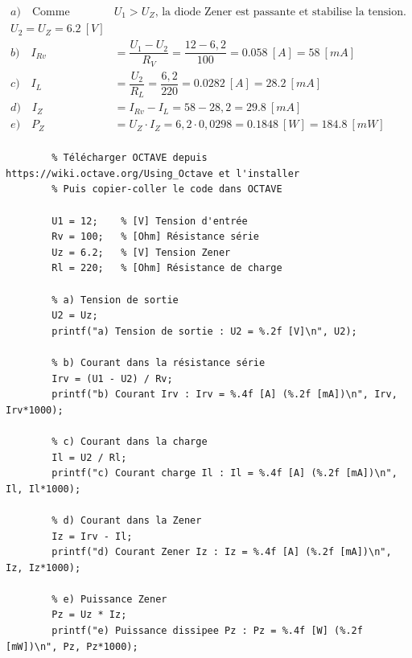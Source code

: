 \documentclass[a4paper,11pt,answers,addpoints]{exam}
\begin{document}
\begin{questions}
\vspace{0.5em}
\begin{solution}
	\begin{align*}
		a) \quad \text{Comme } &U_1 > U_Z \text{, la diode Zener est passante et stabilise la tension.}\\
		U_2 = U_Z = \qty{6,2}{[V]} \\[6pt]
		b) \quad I_{Rv} &= \dfrac{U_1 - U_2}{R_V} = \dfrac{12 - 6,2}{100} = \qty{0,058}{[A]} = \qty{58}{[mA]} \\[6pt]
		c) \quad I_L &= \dfrac{U_2}{R_L} = \dfrac{6,2}{220} = \qty{0,0282}{[A]} = \qty{28,2}{[mA]} \\[6pt]
		d) \quad I_Z &= I_{Rv} - I_L = 58 - 28,2 = \qty{29,8}{[mA]} \\[6pt]
		e) \quad P_Z &= U_Z \cdot I_Z = 6,2 \cdot 0,0298 = \qty{0,1848}{[W]} = \qty{184,8}{[mW]} \\
	\end{align*}

	\begin{verbatim}
		% Télécharger OCTAVE depuis https://wiki.octave.org/Using_Octave et l'installer
		% Puis copier-coller le code dans OCTAVE
		
		U1 = 12;    % [V] Tension d'entrée
		Rv = 100;   % [Ohm] Résistance série
		Uz = 6.2;   % [V] Tension Zener
		Rl = 220;   % [Ohm] Résistance de charge
		
		% a) Tension de sortie
		U2 = Uz;
		printf("a) Tension de sortie : U2 = %.2f [V]\n", U2);
		
		% b) Courant dans la résistance série
		Irv = (U1 - U2) / Rv;
		printf("b) Courant Irv : Irv = %.4f [A] (%.2f [mA])\n", Irv, Irv*1000);
		
		% c) Courant dans la charge
		Il = U2 / Rl;
		printf("c) Courant charge Il : Il = %.4f [A] (%.2f [mA])\n", Il, Il*1000);
		
		% d) Courant dans la Zener
		Iz = Irv - Il;
		printf("d) Courant Zener Iz : Iz = %.4f [A] (%.2f [mA])\n", Iz, Iz*1000);
		
		% e) Puissance Zener
		Pz = Uz * Iz;
		printf("e) Puissance dissipee Pz : Pz = %.4f [W] (%.2f [mW])\n", Pz, Pz*1000);
	\end{verbatim}
	\end{solution}
\end{questions}
\end{document}

